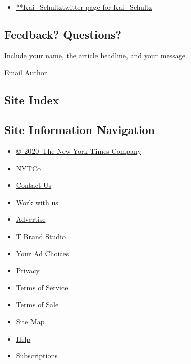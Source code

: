 \begin{itemize}
\tightlist
\item
  \href{https://twitter.com/Kai_Schultz}{**Kai\_Schultztwitter page for
  Kai\_Schultz}
\end{itemize}

\hypertarget{feedback-questions}{%
\subsection{Feedback? Questions?}\label{feedback-questions}}

Include your name, the article headline, and your message.

Email Author

\hypertarget{site-index}{%
\subsection{Site Index}\label{site-index}}

\hypertarget{site-information-navigation}{%
\subsection{Site Information
Navigation}\label{site-information-navigation}}

\begin{itemize}
\tightlist
\item
  \href{https://help.nytimes.com/hc/en-us/articles/115014792127-Copyright-notice}{©~2020~The
  New York Times Company}
\end{itemize}

\begin{itemize}
\tightlist
\item
  \href{https://www.nytco.com/}{NYTCo}
\item
  \href{https://help.nytimes.com/hc/en-us/articles/115015385887-Contact-Us}{Contact
  Us}
\item
  \href{https://www.nytco.com/careers/}{Work with us}
\item
  \href{https://nytmediakit.com/}{Advertise}
\item
  \href{http://www.tbrandstudio.com/}{T Brand Studio}
\item
  \href{https://www.nytimes.com/privacy/cookie-policy\#how-do-i-manage-trackers}{Your
  Ad Choices}
\item
  \href{https://www.nytimes.com/privacy}{Privacy}
\item
  \href{https://help.nytimes.com/hc/en-us/articles/115014893428-Terms-of-service}{Terms
  of Service}
\item
  \href{https://help.nytimes.com/hc/en-us/articles/115014893968-Terms-of-sale}{Terms
  of Sale}
\item
  \href{https://spiderbites.nytimes.com}{Site Map}
\item
  \href{https://help.nytimes.com/hc/en-us}{Help}
\item
  \href{https://www.nytimes.com/subscription?campaignId=37WXW}{Subscriptions}
\end{itemize}
